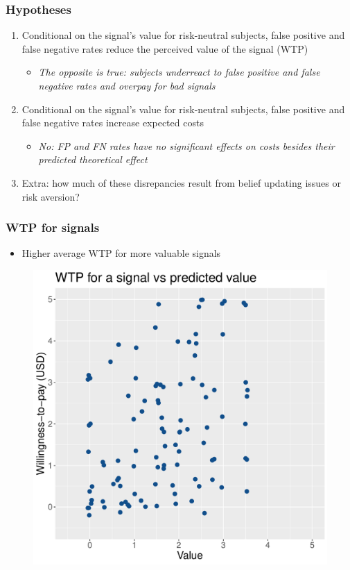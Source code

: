 \documentclass[11pt,hyperref={bookmarks=false}]{beamer}
\begin{document}
\begin{frame}
\frametitle{Hypotheses}
\begin{enumerate}
\item Conditional on the signal's value for risk-neutral subjects, false positive and false negative rates reduce the perceived value of the signal (WTP)
\begin{itemize}
\item \textit{The opposite is true: subjects underreact to false positive and false negative rates and overpay for bad signals}
\end{itemize}
\item Conditional on the signal's value for risk-neutral subjects, false positive and false negative rates increase expected costs
\begin{itemize}
\item \textit{No: FP and FN rates have no significant effects on costs besides their predicted theoretical effect}
\end{itemize}
\item Extra: how much of these disrepancies result from belief updating issues or risk aversion? 
\end{enumerate}
\end{frame}

\iffalse
\begin{frame}
\frametitle{WTP for signals}
\begin{itemize}
\item Higher average WTP for more valuable signals
\end{itemize}
\begin{figure}[h]
\includegraphics[scale=0.45]{Graphs/WTP_curve2.pdf}
\end{figure}
\end{frame}
\end{document}
